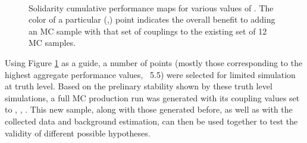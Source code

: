     \begin{figure}[tbh]
        \\
        \caption{
            Solidarity cumulative performance maps for various values of \kv.
            The color of a particular (\kvv,\kl) point indicates the overall
                benefit to adding an MC sample with that set of couplings
                to the existing set of 12 MC samples.
        }
        \label{fig:solidarity_performance_map}
    \end{figure}

    Using Figure \ref{fig:solidarity_performance_map} as a guide,
        a number of points (mostly those corresponding to the highest aggregate performance values, ~5.5)
        were selected for limited simulation at truth level.
    Based on the prelinary stability shown by these truth level simulations,
        a full MC production run was generated with its coupling values set to , , .
    This new sample, along with those generated before, as well as with the collected data and background estimation,
        can then be used together to test the validity of different possible hypotheses.
